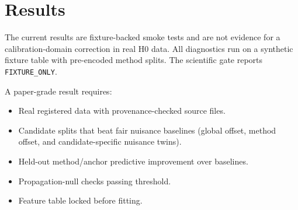 \section{Results}

The current results are fixture-backed smoke tests and are not evidence for a
calibration-domain correction in real H0 data. All diagnostics run on a synthetic
fixture table with pre-encoded method splits. The scientific gate reports
\texttt{FIXTURE_ONLY}.

A paper-grade result requires:
\begin{itemize}
  \item Real registered data with provenance-checked source files.
  \item Candidate splits that beat fair nuisance baselines (global offset, method
    offset, and candidate-specific nuisance twins).
  \item Held-out method/anchor predictive improvement over baselines.
  \item Propagation-null checks passing threshold.
  \item Feature table locked before fitting.
\end{itemize}
